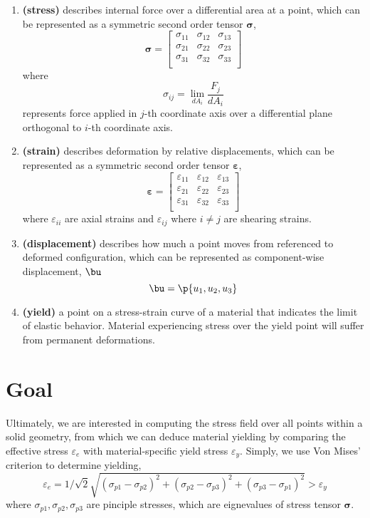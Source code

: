 \documentclass[11pt]{article}
\newcommand{\bheading}[1]{\textbf{(#1)}}
\newcommand{\bsigma}{\boldsymbol{\sigma}}
\newcommand{\bepsilon}{\boldsymbol{\varepsilon}}
\renewcommand{\epsilon}{\varepsilon}
\begin{document}
\begin{enumerate}
    \item \bheading{stress} describes internal force over a differential area at a point, which can be represented as a symmetric second order tensor $\bsigma$,
    \[
        \bsigma = 
        \begin{bmatrix}
            \sigma_{11} & \sigma_{12} & \sigma_{13} \\
            \sigma_{21} & \sigma_{22} & \sigma_{23} \\
            \sigma_{31} & \sigma_{32} & \sigma_{33} \\
        \end{bmatrix}    
    \]
    where
    \[
        \sigma_{ij} = \lim_{dA_i} \dfrac{F_j}{dA_i}
    \] 
    represents force applied in $j$-th coordinate axis over a differential plane orthogonal to $i$-th coordinate axis. 
    \item \bheading{strain} describes deformation by relative displacements, which can be represented as a symmetric second order tensor $\bepsilon$,
    \[
        \bepsilon = 
        \begin{bmatrix}
            \epsilon_{11} & \epsilon_{12} & \epsilon_{13} \\
            \epsilon_{21} & \epsilon_{22} & \epsilon_{23} \\
            \epsilon_{31} & \epsilon_{32} & \epsilon_{33} \\
        \end{bmatrix}
    \]
    where $\epsilon_{ii}$ are axial strains and $\epsilon_{ij}$ where $i\neq j$ are shearing strains.
    \item \bheading{displacement} describes how much a point moves from referenced to deformed configuration, which can be represented as component-wise displacement, $\bu$
    \[
        \bu = \p{u_1, u_2, u_3}
    \]
    \item \bheading{yield} a point on a stress-strain curve of a material that indicates the limit of elastic behavior. Material experiencing stress over the yield point will suffer from permanent deformations.
\end{enumerate}


\section*{Goal}

Ultimately, we are interested in computing the stress field over all points within a solid geometry, from which we can deduce material yielding by comparing the effective stress $\epsilon_e$ with material-specific yield stress $\epsilon_y$. Simply, we use Von Mises' criterion to determine yielding, 
\[
    \epsilon_e = 1/\sqrt{2} \sqrt{
        (\sigma_{p1} - \sigma_{p2})^2 
        + (\sigma_{p2} - \sigma_{p3})^2 
        + (\sigma_{p3} - \sigma_{p1})^2
    } > \epsilon_y
\]
where $\sigma_{p1}, \sigma_{p2}, \sigma_{p3}$ are pinciple stresses, which are eignevalues of stress tensor $\bsigma$.
\end{document}

